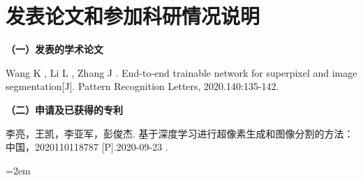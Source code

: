 
\chapter*{发表论文和参加科研情况说明}
\setlength{\parindent}{0em}
\textbf{（一）发表的学术论文}
\begin{publist}
\item  Wang K , Li L , Zhang J . End-to-end trainable network for superpixel and image segmentation[J]. Pattern Recognition Letters, 2020.140:135-142.
\end{publist}

\vspace*{1em}
\textbf{（二）申请及已获得的专利}
\begin{publist}
\item 李亮，王凯，李亚军，彭俊杰. 基于深度学习进行超像素生成和图像分割的方法：中国，2020110118787 [P].2020-09-23 .
\end{publist}
\vspace*{1em}
\vfill
{}\hangindent=2em\noindent

\setlength{\parindent}{2em}
